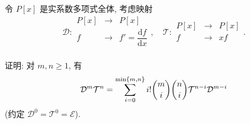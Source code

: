 \documentclass[color=black,device=normal,lang=cn,mode=geye]{elegantnote}
\begin{document}
\begin{exercisec}[2.5.3]
    令 $P[x]$ 是实系数多项式全体, 考虑映射
    \[\mathcal{D}:\begin{array}{rcl}
        P[x] & \to & P[x] \\
        f & \to & f'=\dfrac{\mathrm{d}f}{\mathrm{d}x} \\
    \end{array},\quad\mathcal{T}:\begin{array}{rcl}
        P[x] & \to & P[x] \\
        f & \to & xf \\
    \end{array}.\]

    证明: 对 $m,n\geq1$, 有
    \begin{equation}\label{eq2.6}
        \mathcal{D}^m\mathcal{T}^n=\sum\limits_{i=0}^{\min\{m,n\}}i!\dbinom{m}{i}\dbinom{n}{i}\mathcal{T}^{n-i}\mathcal{D}^{m-i}
    \end{equation}
    (约定 $\mathcal{D}^0=\mathcal{T}^0=\mathcal{E}$).
\end{exercisec}
\end{document}
